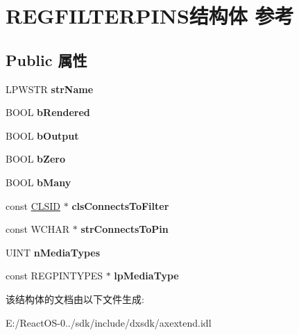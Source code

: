 \hypertarget{struct_r_e_g_f_i_l_t_e_r_p_i_n_s}{}\section{R\+E\+G\+F\+I\+L\+T\+E\+R\+P\+I\+N\+S结构体 参考}
\label{struct_r_e_g_f_i_l_t_e_r_p_i_n_s}
\subsection*{Public 属性}
\begin{DoxyCompactItemize}
\item 
\mbox{\label{struct_r_e_g_f_i_l_t_e_r_p_i_n_s_a0648516a3d1b22a0a718841f1307bf7b}} 
L\+P\+W\+S\+TR {\bfseries str\+Name}
\item 
\mbox{\label{struct_r_e_g_f_i_l_t_e_r_p_i_n_s_a6dffd082cb3b6eff563f106d53ef20df}} 
B\+O\+OL {\bfseries b\+Rendered}
\item 
\mbox{\label{struct_r_e_g_f_i_l_t_e_r_p_i_n_s_adf51fb403ccc4068a917ec90a11c1e27}} 
B\+O\+OL {\bfseries b\+Output}
\item 
\mbox{\label{struct_r_e_g_f_i_l_t_e_r_p_i_n_s_a56d1e9c8628bd07349c67640e7d96f40}} 
B\+O\+OL {\bfseries b\+Zero}
\item 
\mbox{\label{struct_r_e_g_f_i_l_t_e_r_p_i_n_s_afe65eb80c30564c7852f3026c8950148}} 
B\+O\+OL {\bfseries b\+Many}
\item 
\mbox{\label{struct_r_e_g_f_i_l_t_e_r_p_i_n_s_a673d742b756b1e26cbb1bb329436eb01}} 
const \hyperlink{struct___i_i_d}{C\+L\+S\+ID} $\ast$ {\bfseries cls\+Connects\+To\+Filter}
\item 
\mbox{\label{struct_r_e_g_f_i_l_t_e_r_p_i_n_s_a8cca3fe3f45d5cee2d3bf56fdda4d3c9}} 
const W\+C\+H\+AR $\ast$ {\bfseries str\+Connects\+To\+Pin}
\item 
\mbox{\label{struct_r_e_g_f_i_l_t_e_r_p_i_n_s_a9930a67884348f86be100daf4991e99d}} 
U\+I\+NT {\bfseries n\+Media\+Types}
\item 
\mbox{\label{struct_r_e_g_f_i_l_t_e_r_p_i_n_s_a85d733f1ea821c886558c308e23843bc}} 
const R\+E\+G\+P\+I\+N\+T\+Y\+P\+ES $\ast$ {\bfseries lp\+Media\+Type}
\end{DoxyCompactItemize}


该结构体的文档由以下文件生成\+:\begin{DoxyCompactItemize}
\item 
E\+:/\+React\+O\+S-\/0../sdk/include/dxsdk/axextend.\+idl\end{DoxyCompactItemize}
